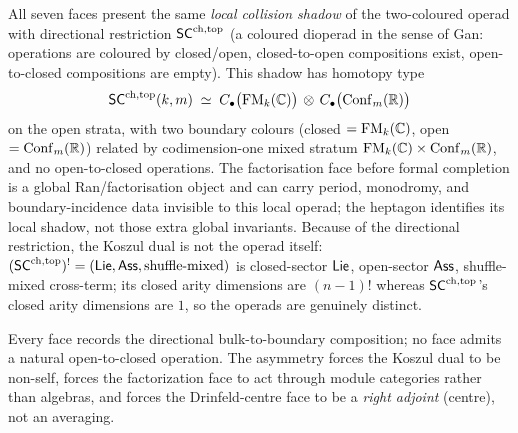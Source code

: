 \begin{convention}\label{conv:heptagon-object}
All seven faces present the same \emph{local collision shadow} of the
two-coloured operad with directional restriction $\mathsf{SC}^{\mathrm{ch},\mathrm{top}}$ (a
coloured dioperad in the sense of Gan: operations are coloured by
closed/open, closed-to-open compositions exist, open-to-closed
compositions are empty). This shadow has homotopy type
\begin{equation}
 \mathsf{SC}^{\mathrm{ch},\mathrm{top}}(k,m)
 \;\simeq\;
 C_{\bullet}\bigl(\mathrm{FM}_k(\mathbb{C})\bigr)
 \,\otimes\,
 C_{\bullet}\bigl(\mathrm{Conf}_m(\mathbb{R})\bigr)
\end{equation}
on the open strata, with two boundary colours
(closed $=\mathrm{FM}_k(\mathbb{C})$, open $=\mathrm{Conf}_m(\mathbb{R})$) related by
codimension-one mixed stratum $\mathrm{FM}_k(\mathbb{C})\times\mathrm{Conf}_m(\mathbb{R})$,
and no open-to-closed operations. The factorisation face before
formal completion is a global Ran/factorisation object and can carry
period, monodromy, and boundary-incidence data invisible to this local
operad; the heptagon identifies its local shadow, not those extra
global invariants. Because of the directional restriction, the Koszul
dual is not the operad itself:
$(\mathsf{SC}^{\mathrm{ch},\mathrm{top}})^{!}=(\mathsf{Lie},\mathsf{Ass},\text{shuffle-mixed})$ is closed-sector
$\mathsf{Lie}$, open-sector $\mathsf{Ass}$, shuffle-mixed cross-term; its closed
arity dimensions are $(n-1)!$ whereas $\mathsf{SC}^{\mathrm{ch},\mathrm{top}}$'s closed arity
dimensions are $1$, so the operads are genuinely distinct.
\end{convention}

\begin{remark}\label{rem:heptagon-asymmetry}
Every face records the directional bulk-to-boundary composition;
no face admits a natural open-to-closed operation. The asymmetry forces
the Koszul dual to be non-self, forces the factorization face to act
through module categories rather than algebras, and forces the
Drinfeld-centre face to be a \emph{right adjoint} (centre), not an
averaging.
\end{remark}

